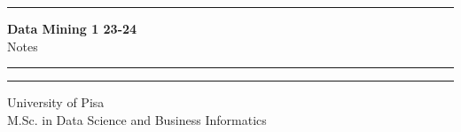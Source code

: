 \documentclass[12pt]{report}
\begin{document}
\begin{titlepage}
\hrule
\vspace{15pt}
\begin{center}
    \Huge{\textbf{\Huge \textbf{Data Mining 1 23-24}} \\ Notes}\\
\end{center}
\vspace{15pt}
\hrule
\vfill
\hrule
\begin{center}
    \Large University of Pisa \\ M.Sc. in Data Science and Business Informatics
\end{center}
\end{titlepage}

\tableofcontents






\end{document}
